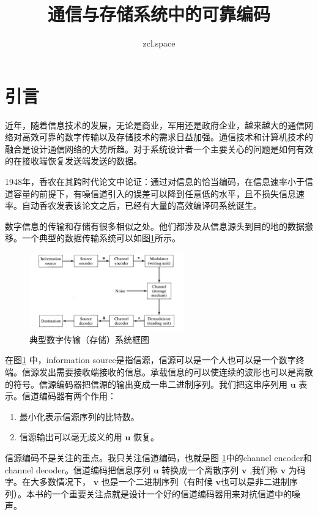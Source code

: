 \documentclass[10pt,a4paper,UTF8]{article}
\author{zcl.space}
\date{}
\title{通信与存储系统中的可靠编码}
\begin{document}
\maketitle
\tableofcontents



\section{引言}
\label{sec:orgheadline1}


近年，随着信息技术的发展，无论是商业，军用还是政府企业，越来越大的通信网络对高效可靠的数字传输以及存储技术的需求日益加强。通信技术和计算机技术的融合是设计通信网络的大势所趋。对于系统设计者一个主要关心的问题是如何有效的在接收端恢复发送端发送的数据。

1948年，香农在其跨时代论文中论证：通过对信息的恰当编码，在信息速率小于信道容量的前提下，有噪信道引入的误差可以降到任意低的水平，且不损失信息速率。自动香农发表该论文之后，已经有大量的高效编译码系统诞生。

数字信息的传输和存储有很多相似之处。他们都涉及从信息源头到目的地的数据搬移。一个典型的数据传输系统可以如图\ref{fig:orgparagraph1}所示。

\begin{figure}[htb]
\centering
\includegraphics[width=0.6\textwidth]{../../img/20161111figure01_01.png}
\caption{\label{fig:orgparagraph1}
典型数字传输（存储）系统框图}
\end{figure}


在图\ref{fig:orgparagraph1} 中，information source是指信源，信源可以是一个人也可以是一个数字终端。信源发出需要接收端接收的信息。承载信息的可以使连续的波形也可以是离散的符号。信源编码器把信源的输出变成一串二进制序列。我们把这串序列用 \(\mathbf{u}\) 表示。信道编码器有两个作用：
\begin{enumerate}
\item 最小化表示信源序列的比特数。
\item 信源输出可以毫无歧义的用 \(\mathbf{u}\) 恢复。
\end{enumerate}

信源编码不是关注的重点。我只关注信道编码，也就是图 \ref{fig:orgparagraph1}中的channel encoder和channel decoder。信道编码把信息序列 \(\mathbf{u}\) 转换成一个离散序列 \(\mathbf{v}\) ,我们称 \(\mathbf{v}\) 为码字。在大多数情况下， \(\mathbf{v}\) 也是一个二进制序列（有时候 \(\mathbf{v}\)也可以是非二进制序列）。本书的一个重要关注点就是设计一个好的信道编码器用来对抗信道中的噪声。
\end{document}
